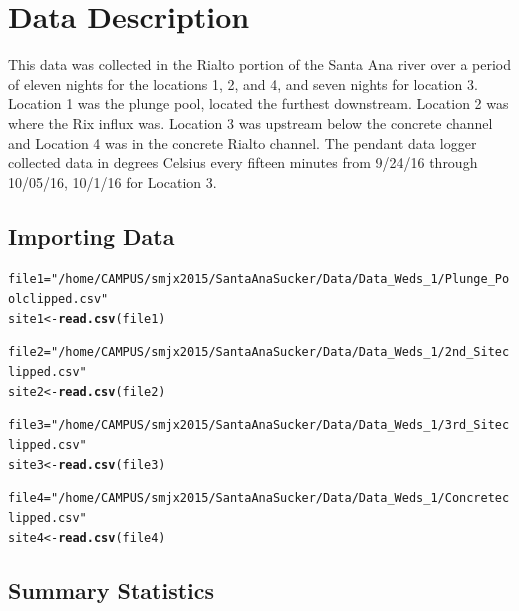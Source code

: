 \documentclass{article}\usepackage[]{graphicx}\usepackage[]{color}
\makeatletter
\newcommand{\hlstr}[1]{\textcolor[rgb]{0.192,0.494,0.8}{#1}}%
\newcommand{\hlstd}[1]{\textcolor[rgb]{0.345,0.345,0.345}{#1}}%
\newcommand{\hlkwb}[1]{\textcolor[rgb]{0.69,0.353,0.396}{#1}}%
\newcommand{\hlkwd}[1]{\textcolor[rgb]{0.737,0.353,0.396}{\textbf{#1}}}%
\newenvironment{kframe}{%
 \def\at@end@of@kframe{}%
 \ifinner\ifhmode%
  \def\at@end@of@kframe{\end{minipage}}%
  \begin{minipage}{\columnwidth}%
 \fi\fi%
 \def\FrameCommand##1{\hskip\@totalleftmargin \hskip-\fboxsep
 \colorbox{shadecolor}{##1}\hskip-\fboxsep
     \hskip-\linewidth \hskip-\@totalleftmargin \hskip\columnwidth}%
 \MakeFramed {\advance\hsize-\width
   \@totalleftmargin\z@ \linewidth\hsize
   \@setminipage}}%
 {\par\unskip\endMakeFramed%
 \at@end@of@kframe}
\newenvironment{knitrout}{}{} %
\makeatother
\begin{document}

\section{Data Description}

This data was collected in the Rialto portion of the Santa Ana river over a period of eleven nights for the locations 1, 2, and 4, and seven nights for location 3. Location 1 was the plunge pool, located the furthest downstream. Location 2 was where the Rix influx was. Location 3 was upstream below the concrete channel and Location 4 was in the concrete Rialto channel. The pendant data logger collected data in degrees Celsius every fifteen minutes from 9/24/16 through 10/05/16, 10/1/16 for Location 3. 


\subsection{Importing Data}


\begin{knitrout}
\color{fgcolor}\begin{kframe}
\begin{alltt}
\hlstd{file1} \hlkwb{=} \hlstr{"/home/CAMPUS/smjx2015/Santa Ana Sucker/Data/Data_Weds_1/Plunge_Pool clipped.csv"}
\hlstd{site1} \hlkwb{<-} \hlkwd{read.csv}\hlstd{(file1)}

\hlstd{file2} \hlkwb{=} \hlstr{"/home/CAMPUS/smjx2015/Santa Ana Sucker/Data/Data_Weds_1/2nd_Site clipped.csv"}
\hlstd{site2} \hlkwb{<-} \hlkwd{read.csv}\hlstd{(file2)}

\hlstd{file3} \hlkwb{=} \hlstr{"/home/CAMPUS/smjx2015/Santa Ana Sucker/Data/Data_Weds_1/3rd_Site clipped.csv"}
\hlstd{site3} \hlkwb{<-} \hlkwd{read.csv}\hlstd{(file3)}

\hlstd{file4} \hlkwb{=} \hlstr{"/home/CAMPUS/smjx2015/Santa Ana Sucker/Data/Data_Weds_1/Concrete clipped.csv"}
\hlstd{site4} \hlkwb{<-} \hlkwd{read.csv}\hlstd{(file4)}
\end{alltt}
\end{kframe}
\end{knitrout}


\subsection{Summary Statistics}
\end{document}
